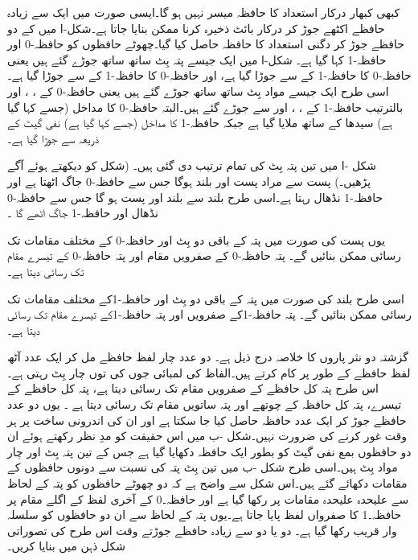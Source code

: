 کبھی کبھار درکار استعداد کا حافظہ میسر نہیں ہو گا۔ایسی صورت میں ایک سے زیادہ حافظے اکٹھے جوڑ کر درکار بائٹ ذخیرہ کرنا ممکن بنایا جاتا ہے۔شکل-ا میں  کے دو حافظے جوڑ کر دگنی استعداد کا  حافظہ حاصل کیا گیا۔چھوٹے حافظوں کو حافظہ-0 اور حافظہ-1 کہا گیا ہے۔ شکل-ا میں ایک جیسے پتہ بِٹ ساتھ ساتھ جوڑے گئے ہیں یعنی حافظہ-0 کا  حافظہ-1 کے  سے جوڑا گیا ہے، اور حافظہ-0 کا  حافظہ-1 کے  سے جوڑا گیا ہے۔اسی طرح ایک جیسے مواد بِٹ ساتھ ساتھ جوڑے گئے ہیں یعنی حافظہ-0 کے ، ،  اور  بالترتیب حافظہ-1 کے ، ،  اور  سے جوڑے گئے ہیں۔البتہ حافظہ-0 کا  مداخل (جسے کہا گیا ہے) سیدھا  کے ساتھ ملایا گیا ہے جبکہ حافظہ-1 کا  مداخل (جسے  کہا گیا ہے) نفی گیٹ کے ذریعہ  سے جوڑا گیا ہے۔



شکل -ا میں تین پتہ بِٹ کی تمام ترتیب دی گئی ہیں۔ (شکل  کو دیکھتے ہوئے آگے پڑھیں۔) پست  سے مراد پست  اور بلند  ہوگا جس سے حافظہ-0 جاگ اٹھتا ہے اور حافظہ-1 نڈھال رہتا ہے۔اسی طرح بلند  سے  بلند اور  پست ہو گا جس سے حافظہ-0 نڈھال اور حافظہ-1 جاگ اٹھے گا ۔

یوں پست  کی صورت میں پتہ کے باقی دو بِٹ  اور  حافظہ-0 کے مختلف مقامات تک رسائی ممکن بنائیں گے۔ پتہ  حافظہ-0 کے صفرویں مقام اور پتہ  حافظہ-0 کے تیسرے مقام تک رسائی دیتا ہے۔



اسی طرح بلند  کی صورت میں پتہ کے باقی دو بِٹ  اور  حافظہ-1کے مختلف مقامات تک رسائی ممکن بنائیں گے۔ پتہ  حافظہ-1کے صفرویں اور پتہ  حافظہ-1کے تیسرے مقام تک رسائی دیتا ہے۔


گزشتہ دو نثر پاروں کا خلاصہ درج ذیل ہے۔ دو عدد چار لفظ حافظے مل کر ایک عدد آٹھ لفظ حافظے کے طور پر کام کرتے ہیں۔الفاظ کی لمبائی جوں کی توں چار بِٹ رہتی ہے۔اس طرح پتہ  کل حافظے کے صفرویں مقام تک رسائی دیتا ہے، پتہ  کل حافظے کے تیسرے، پتہ  کل حافظہ کے چوتھے اور پتہ  ساتویں مقام تک رسائی دیتا ہے ۔ یوں دو عدد حافظے جوڑ کر ایک عدد حافظہ حاصل کیا جا سکتا ہے اور ان کی اندرونی ساخت پر ہر وقت غور کرنے کی ضرورت نہیں۔شکل -ب میں اس حقیقت کو مدِ نظر رکھتے ہوئے ان دو حافظوں بمع نفی گیٹ کو بطور ایک  حافظہ دکھایا گیا ہے جس کے تین پتہ بِٹ اور چار مواد بِٹ ہیں۔اسی طرح شکل -ب میں تین بِٹ پتہ کی نسبت سے دونوں حافظوں کے مقامات دکھائے گئے ہیں۔اس شکل سے واضح ہے کہ دو چھوٹے حافظوں کو پتہ کے لحاظ سے علیحدہ علیحدہ مقامات پر رکھا گیا ہے اور حافظہ۔0 کے آخری لفظ کے اگلے مقام پر حافظہ۔1 کا صفرواں لفظ پایا جاتا ہے۔یوں پتہ کے لحاظ سے ان دو حافظوں کو سلسلہ وار قریب رکھا گیا ہے۔ دو یا دو سے زیادہ حافظے جوڑتے وقت اس طرح کی تصوراتی شکل ذہن میں بنایا کریں۔
	
